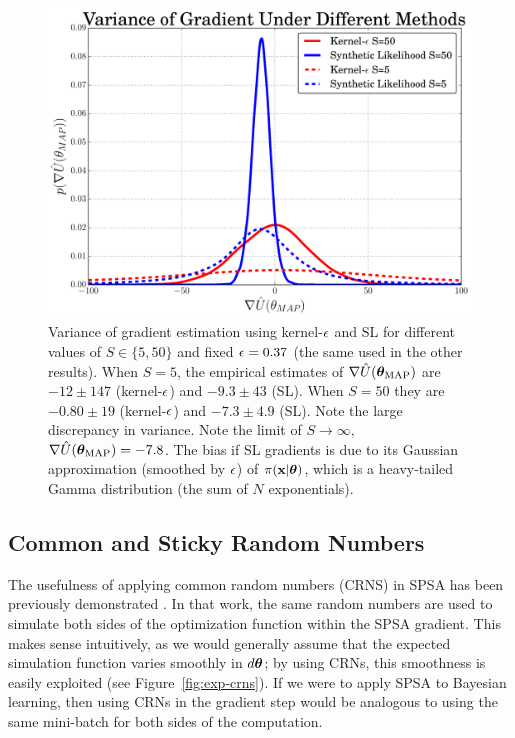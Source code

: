 \documentclass[]{article}
\begin{document}
\begin{figure}[t]
\vskip 0.2in
\begin{center}
\includegraphics[width=0.75\columnwidth]{./images/exp_varg_figure.pdf}
\vspace{-0.1in}
\caption{\small{Variance of gradient estimation using kernel-$\epsilon$ and SL for different values of $S\in\{5,50\}$ and fixed $\epsilon = 0.37$ (the same used in the other results).  
%
When $S=5$, the empirical estimates of  $\nabla \hat{U}({\bm \theta}_{\text{MAP}})$ are $-12 \pm 147$ (kernel-$\epsilon$) and $-9.3 \pm 43$ (SL).  When $S=50$ they are $-0.80 \pm 19$ (kernel-$\epsilon$) and $-7.3 \pm 4.9$ (SL).  Note the large discrepancy in variance.  Note the limit of $S \rightarrow \infty$,   $\nabla \hat{U}({\bm \theta}_{\text{MAP}}) = -7.8$.  The bias if SL gradients is due to its Gaussian approximation (smoothed by $\epsilon$) of $\pi({\bf x}|{\bm \theta})$, which is a heavy-tailed Gamma distribution (the sum of $N$ exponentials).}}
\label{fig:exp-varg}
\end{center}
\vspace{-0.2in}
\end{figure}

\subsection{Common and Sticky Random Numbers}
The usefulness of applying common random numbers (CRNS) in SPSA has been previously demonstrated \cite{kleinman1999simulation}.  In that work, the same random numbers are used to simulate both sides of the optimization function within the SPSA gradient.  This makes sense intuitively, as we would generally assume that the expected simulation function varies smoothly in $d {\bm \theta}$;  by using CRNs, this smoothness is easily exploited (see Figure~\ref{fig:exp-crns}).  If we were to apply SPSA to Bayesian learning, then using CRNs in the gradient step would be analogous to using the same mini-batch for both sides of the computation.  
\end{document}

